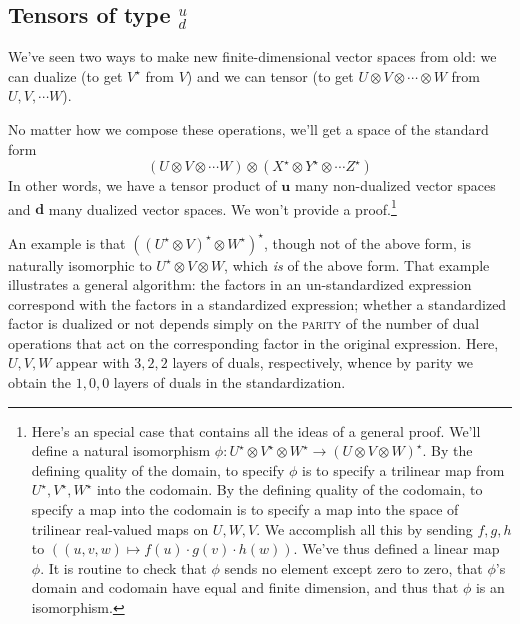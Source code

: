 \documentclass[anon,12pt]{colt2021} %
\begin{document}
{        \subsection{Tensors of type $^u_d$}
            We've seen two ways to make new finite-dimensional
            vector spaces from old: we can dualize (to get $V^\star$ from $V$)
            and we can tensor (to get $U\otimes V\otimes \cdots \otimes W$ from
            $U,V,\cdots W$).

            No matter how we compose these operations, we'll get a space of the
            standard form 
            $$
                (U \otimes
                V \otimes \cdots
                W) \otimes
                (X^\star \otimes
                Y^\star \otimes \cdots
                Z^\star)
            $$
            In other words, we have a tensor product of $\mathbf{u}$ many non-dualized
            vector spaces and $\mathbf{d}$ many dualized vector spaces.  We won't provide
            a proof.\footnote{
                Here's an special case that contains all the ideas of a general
                proof.
                We'll define a natural isomorphism $\phi:U^\star\otimes
                V^\star\otimes W^\star \to (U\otimes V\otimes W)^\star$.  By
                the defining quality of the domain, to specify $\phi$ is to
                specify a trilinear map from $U^\star, V^\star, W^\star$ into
                the codomain.  By the defining quality of the codomain, to
                specify a map into the codomain is to specify a map into the
                space of trilinear real-valued maps on $U, W, V$.  
                We accomplish all this by sending $f,g,h$ to $((u,v,w) \mapsto
                f(u)\cdot g(v)\cdot h(w))$.  We've thus defined a linear map
                $\phi$.  It is routine to check that $\phi$ sends no element
                except zero to zero, that $\phi$'s domain and codomain have
                equal and finite dimension, and thus that $\phi$ is an
                isomorphism.
            }

            An example is that $((U^\star \otimes V)^\star \otimes
            W^\star)^\star$, though not of the above form, is naturally
            isomorphic to $U^\star \otimes V \otimes W$, which \emph{is} of the
            above form.  That example illustrates a general algorithm: the
            factors in an un-standardized expression correspond with the
            factors in a standardized expression; whether a standardized factor
            is dualized or not depends simply on the \textsc{parity} of the
            number of dual operations that act on the corresponding factor in
            the original expression.  Here, $U,V,W$ appear with $3,2,2$ layers
            of duals, respectively, whence by parity we obtain the $1,0,0$
            layers of duals in the standardization.

}
\end{document}
